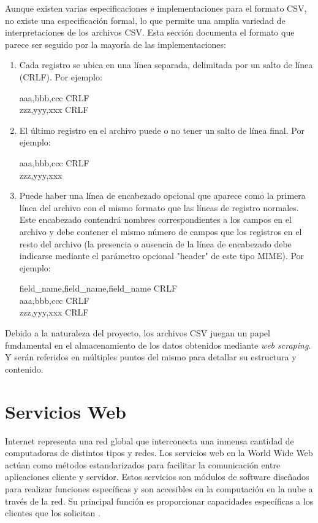 Aunque existen varias especificaciones e implementaciones para el formato CSV,
no existe una especificación formal, lo que permite una amplia variedad de
interpretaciones de los archivos CSV. Esta sección documenta el formato que
parece ser seguido por la mayoría de las implementaciones:

\begin{enumerate}
    \item Cada registro se ubica en una línea separada, delimitada por un salto
      de línea (CRLF). Por ejemplo:

    aaa,bbb,ccc CRLF \\
    zzz,yyy,xxx CRLF

    \item El último registro en el archivo puede o no tener un salto de línea
      final. Por ejemplo:

    aaa,bbb,ccc CRLF \\
    zzz,yyy,xxx

    \item Puede haber una línea de encabezado opcional que aparece como la
      primera línea del archivo con el mismo formato que las líneas de registro
      normales. Este encabezado contendrá nombres correspondientes a los campos
      en el archivo y debe contener el mismo número de campos que los registros
      en el resto del archivo (la presencia o ausencia de la línea de encabezado
      debe indicarse mediante el parámetro opcional "header" de este tipo MIME).
      Por ejemplo:

    field\_name,field\_name,field\_name CRLF \\
    aaa,bbb,ccc CRLF \\
    zzz,yyy,xxx CRLF
\end{enumerate}

Debido a la naturaleza del proyecto, los archivos CSV juegan un papel fundamental
en el almacenamiento de los datos obtenidos mediante \textit{web scraping}. Y
serán referidos en múltiples puntos del mismo para detallar su estructura y
contenido.

\section{Servicios Web}
Internet representa una red global que interconecta una inmensa cantidad de
computadoras de distintos tipos y redes. Los servicios web en la World Wide Web
actúan como métodos estandarizados para facilitar la comunicación entre aplicaciones
cliente y servidor. Estos servicios son módulos de software diseñados para
realizar funciones específicas y son accesibles en la computación en la nube a
través de la red. Su principal función es proporcionar capacidades específicas
a los clientes que los solicitan \cite{Wikipedia_Web_Service}.

